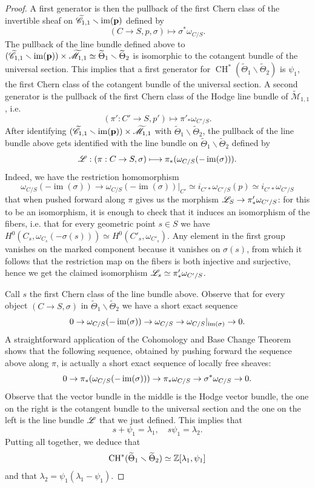 \documentclass[a4paper, 10pt]{amsart}
\numberwithin{equation}{section}
\numberwithin{subsection}{section}
\theoremstyle{definition}
\theoremstyle{remark}
\renewcommand{\mathcal}{\mathscr}
\newcommand\arr{\ifinner\to\else\longrightarrow\fi}
\newcommand\im[1]{\operatorname{im}(#1)}
\newcommand{\Mtilde}{\widetilde{\mathcal M}}
\newcommand{\Ctilde}{\widetilde{\mathcal C}}
\newcommand{\ThTilde}{\widetilde{\Theta}}
\newcommand{\ch}[1][*]{\operatorname{CH}^{#1}}
\begin{document}
\begin{proof}
		A first generator is then the pullback of the first Chern class of the invertible sheaf on $\Ctilde_{1,1}\smallsetminus\im{\bfp}$ defined by
		\[ (C\to S,p,\sigma)\longmapsto \sigma^*\omega_{C/S}. \]
		The pullback of the line bundle defined above to $(\Ctilde_{1,1}\smallsetminus\im{\bfp})\times\Mtilde_{1,1}\simeq \ThTilde_1\smallsetminus\ThTilde_2$ is isomorphic to the cotangent bundle of the universal section. This implies that a first generator for $\ch(\ThTilde_1\smallsetminus\ThTilde_2)$ is $\psi_1$, the first Chern class of the cotangent bundle of the universal section.
		A second generator is the pullback of the first Chern class of the Hodge line bundle of $\Mtilde_{1,1}$, i.e.
		\[ (\pi':C'\to S,p')\longmapsto \pi'_*\omega_{C'/S}. \]
		After identifying $(\Ctilde_{1,1}\smallsetminus\im{\bfp})\times\Mtilde_{1,1}$ with $\ThTilde_1\smallsetminus\ThTilde_2$, the pullback of the line bundle above gets identified with the line bundle on $\ThTilde_{1}\smallsetminus\ThTilde_2$ defined by
		\[ \cL:(\pi:C\to S,\sigma)\longmapsto \pi_*(\omega_{C/S}(-\im{\sigma})). \] 
		Indeed, we have the restriction homomorphism 
		\[ \omega_{C/S}(-\im{\sigma})\longrightarrow \omega_{C/S}(-\im{\sigma})|_{C'}\simeq i_{C'*}\omega_{C'/S}(p)\simeq i_{C'*}\omega_{C'/S} \]
		that when pushed forward along $\pi$ gives us the morphism $\cL_S\to\pi'_*\omega_{C'/S}$: for this to be an isomorphism, it is enough to check that it induces an isomorphism of the fibers, i.e. that for every geometric point $s\in S$ we have $H^0(C_{s},\omega_{C_s}(-\sigma(s)))\simeq H^0(C'_{s},\omega_{C'_s})$. Any element in the first group vanishes on the marked component because it vanishes on $\sigma(s)$, from which it follows that the restriction map on the fibers is both injective and surjective, hence we get the claimed isomorphism $\cL_s\simeq \pi'_*\omega_{C'/S}$.
		
		Call $s$ the first Chern class of the line bundle above. Observe that for every object $(C\to S,\sigma)$ in $\ThTilde_1\smallsetminus\ThTilde_2$ we have a short exact sequence
		\[ 0 \arr \omega_{C/S}(-\im{\sigma}) \arr \omega_{C/S} \arr \omega_{C/S}|_{\im{\sigma}} \arr 0. \]
		A straightforward application of the Cohomology and Base Change Theorem shows that the following sequence, obtained by pushing forward the sequence above along $\pi$, is actually a short exact sequence of locally free sheaves:
		\[ 0 \arr \pi_*(\omega_{C/S}(-\im{\sigma})) \arr \pi_*\omega_{C/S} \arr \sigma^*\omega_{C/S} \arr 0. \]
		Observe that the vector bundle in the middle is the Hodge vector bundle, the one on the right is the cotangent bundle to the universal section and the one on the left is the line bundle $\cL$ that we just defined. This implies that
		\[ s+\psi_1=\lambda_1,\quad s\psi_1 =\lambda_2. \]
		Putting all together, we deduce that
		\[ \ch(\ThTilde_1\smallsetminus\ThTilde_2)\simeq \ZZ[\lambda_1,\psi_1] \]
		and that $\lambda_2=\psi_1(\lambda_1-\psi_1)$.
	\end{proof}
\end{document}
